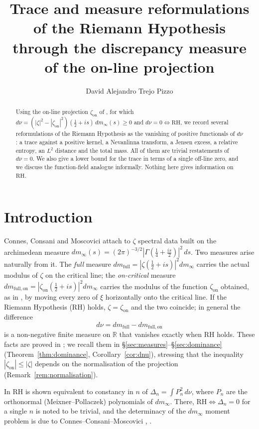 \documentclass[11pt]{amsart}
\title[Trace and measure reformulations]{Trace and measure reformulations of the Riemann Hypothesis\\
through the discrepancy measure of the on-line projection}
\author{David Alejandro Trejo Pizzo}
\theoremstyle{definition}
\theoremstyle{remark}
\newcommand{\RH}{\mathrm{RH}}
\newcommand{\half}{\tfrac12}
\newcommand{\dnu}{d\nu}
\newcommand{\dmfull}{dm_{\mathrm{full}}}
\newcommand{\dmon}{dm_{\mathrm{full,on}}}
\newcommand{\zon}{\zeta_{\mathrm{on}}}
\begin{document}
\begin{abstract}
Using the on-line projection $\zon$ of \cite{MomentRigidity}, for which
$\dnu=(|\zeta|^2-|\zon|^2)(\half+is)\,dm_\infty(s)\ge0$ and $\dnu=0\iff\RH$, we record several
reformulations of the Riemann Hypothesis as the vanishing of positive functionals of $\dnu$: a
trace against a positive kernel, a Nevanlinna transform, a Jensen excess, a relative entropy, an
$L^2$ distance and the total mass. All of them are trivial restatements of $\dnu=0$. We also give
a lower bound for the trace in terms of a single off-line zero, and we discuss the function-field
analogue informally. Nothing here gives information on $\RH$.
\end{abstract}
\maketitle

\tableofcontents
\newpage

\section{Introduction}

Connes, Consani and Moscovici \cite{CCMprolate,CCMq,CCM} attach to $\zeta$ spectral data built on the
archimedean measure $dm_\infty(s)=(2\pi)^{-3/2}|\Gamma(\tfrac14+\tfrac{is}2)|^2\,ds$. Two
measures arise naturally from it. The \emph{full} measure $\dmfull=|\zeta(\half+is)|^2dm_\infty$
carries the actual modulus of $\zeta$ on the critical line; the \emph{on-critical} measure
$\dmon=|\zon(\half+is)|^2dm_\infty$ carries the modulus of the function $\zon$ obtained, as in
\cite{MomentRigidity}, by moving every zero of $\xi$ horizontally onto the critical line. If the
Riemann Hypothesis ($\RH$) holds, $\zeta=\zon$ and the two coincide; in general the difference
\[
\dnu=\dmfull-\dmon
\]
is a non-negative finite measure on $\mathbb R$ that vanishes exactly when $\RH$ holds. These
facts are proved in \cite[\S3]{MomentRigidity}; we recall them in
\S\ref{sec:measures}--\S\ref{sec:dominance} (Theorem~\ref{thm:dominance},
Corollary~\ref{cor:dnu}), stressing that the inequality $|\zon|\le|\zeta|$ depends on the
normalisation of the projection (Remark~\ref{rem:normalisation}).

In \cite{MomentRigidity} $\RH$ is shown equivalent to constancy in $n$ of
$\Delta_n=\int P_n^2\,\dnu$, where $P_n$ are the orthonormal (Meixner--Pollaczek) polynomials of
$dm_\infty$. There, $\RH\iff\Delta_n=0$ for a single $n$ is noted to be trivial, and the
determinacy of the $dm_\infty$ moment problem is due to Connes--Consani--Moscovici
\cite[Prop.~3.3, Thm.~5.2]{CCMprolate}, \cite[Prop.~3.1]{CCMq}.
\end{document}
